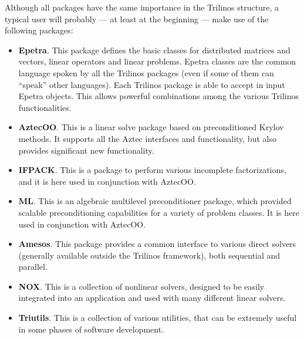 Although all packages have the same importance in the Trilinos
structure, a typical user will probably --- at least at the beginning
--- make use of the following packages:
\begin{itemize} 
\item {\bf Epetra}. This package defines the basic classes for
  distributed matrices and vectors, linear operators and linear
  problems. Epetra classes are the common language spoken by all the
  Trilinos packages (even if some of them can ``speak'' other
  languages). Each Trilinos package is able to accept in input Epetra
  objects. This allows powerful combinations among the various Trilinos
  functionalities.
\item {\bf AztecOO}. This is a linear solve package based on
  preconditioned Krylov methods. It supports all the Aztec interfaces
  and functionality, but also provides significant new functionality.
\item {\bf IFPACK}. This is a package to perform various incomplete
  factorizations, and it is here used in conjunction with AztecOO.
\item {\bf ML}. This is an algebraic multilevel preconditioner package, which
  provided scalable preconditioning capabilities for a variety of
  problem classes. It is here used in conjunction with AztecOO.
\item {\bf Amesos}. This package provides a common interface to various
  direct solvers (generally available outside the Trilinos framework),
  both sequential and parallel.
\item {\bf NOX}. This is a collection of nonlinear solvers, designed to
  be easily integrated into an application and used with many different
  linear solvers.
\item {\bf Triutils}. This is a collection of various utilities, that
  can be extremely useful in some phases of software development.
\end{itemize}

